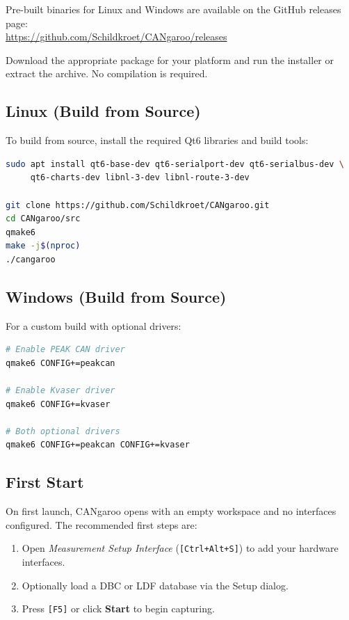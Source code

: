 \documentclass[a4paper,11pt]{article}
\newcommand{\key}[1]{\texttt{\small[#1]}}
\newcommand{\menu}[1]{\textit{#1}}
\newcommand{\ui}[1]{\textbf{#1}}
\begin{document}
Pre-built binaries for Linux and Windows are available on the GitHub releases page:\\
\url{https://github.com/Schildkroet/CANgaroo/releases}

Download the appropriate package for your platform and run the installer or extract
the archive. No compilation is required.

\subsection{Linux (Build from Source)}

To build from source, install the required Qt6 libraries and build tools:

\begin{lstlisting}[language=bash, caption={Build on Linux}]
sudo apt install qt6-base-dev qt6-serialport-dev qt6-serialbus-dev \
     qt6-charts-dev libnl-3-dev libnl-route-3-dev

git clone https://github.com/Schildkroet/CANgaroo.git
cd CANgaroo/src
qmake6
make -j$(nproc)
./cangaroo
\end{lstlisting}

\subsection{Windows (Build from Source)}

For a custom build with optional drivers:

\begin{lstlisting}[language=bash, caption={Optional driver flags}]
# Enable PEAK CAN driver
qmake6 CONFIG+=peakcan

# Enable Kvaser driver
qmake6 CONFIG+=kvaser

# Both optional drivers
qmake6 CONFIG+=peakcan CONFIG+=kvaser
\end{lstlisting}

\subsection{First Start}

On first launch, CANgaroo opens with an empty workspace and no interfaces configured.
The recommended first steps are:

\begin{enumerate}
  \item Open \menu{Measurement \textrightarrow{} Setup Interface} (\key{Ctrl+Alt+S}) to add
        your hardware interfaces.
  \item Optionally load a DBC or LDF database via the Setup dialog.
  \item Press \key{F5} or click \ui{Start} to begin capturing.
\end{enumerate}
\end{document}
